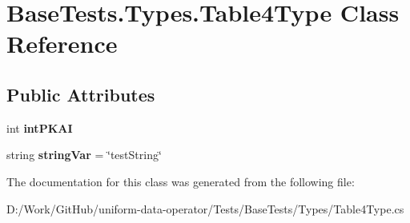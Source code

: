 \hypertarget{class_base_tests_1_1_types_1_1_table4_type}{}\section{Base\+Tests.\+Types.\+Table4\+Type Class Reference}
\label{class_base_tests_1_1_types_1_1_table4_type}
\subsection*{Public Attributes}
\begin{DoxyCompactItemize}
\item 
\mbox{\label{class_base_tests_1_1_types_1_1_table4_type_abd9dec41fe331ba2b57dda96f660f603}} 
int {\bfseries int\+P\+K\+AI}
\item 
\mbox{\label{class_base_tests_1_1_types_1_1_table4_type_a074de14ad3b69717e4eca6a7e714e1c5}} 
string {\bfseries string\+Var} = \char`\"{}test\+String\char`\"{}
\end{DoxyCompactItemize}


The documentation for this class was generated from the following file\+:\begin{DoxyCompactItemize}
\item 
D\+:/\+Work/\+Git\+Hub/uniform-\/data-\/operator/\+Tests/\+Base\+Tests/\+Types/Table4\+Type.\+cs\end{DoxyCompactItemize}
